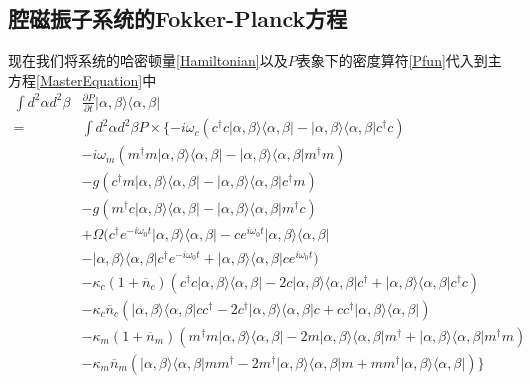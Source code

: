\subsection{腔磁振子系统的Fokker-Planck方程}
现在我们将系统的哈密顿量\eqref{Hamiltonian}以及$P$表象下的密度算符\eqref{Pfun}代入到主方程\eqref{MasterEquation}中
\begin{equation}
\begin{aligned}
\int d^{2}\alpha d^{2}\beta &\frac{\partial P}{\partial t} |\alpha,\beta\rangle \langle \alpha,\beta| \\
= {} &\int d^{2}\alpha d^{2}\beta P \times 
\{ 
-i\omega_{c} \left(c^{\dag}c|\alpha,\beta\rangle \langle \alpha,\beta| - |\alpha,\beta\rangle \langle \alpha,\beta|c^{\dag}c\right) \\
&-i\omega_{m} \left(m^{\dag}m|\alpha,\beta\rangle \langle \alpha,\beta| - |\alpha,\beta\rangle \langle \alpha,\beta|m^{\dag}m\right) \\
&-g \left(c^{\dag}m|\alpha,\beta\rangle \langle \alpha,\beta| - |\alpha,\beta\rangle \langle \alpha,\beta|c^{\dag}m\right) \\
&-g \left(m^{\dag}c|\alpha,\beta\rangle \langle \alpha,\beta| - |\alpha,\beta\rangle \langle \alpha,\beta|m^{\dag}c\right) \\
&+\Omega (c^{\dag}e^{-i\omega_{0}t}|\alpha,\beta\rangle \langle \alpha,\beta|-ce^{i\omega_{0}t}|\alpha,\beta\rangle \langle \alpha,\beta| \\
&-|\alpha,\beta\rangle \langle \alpha,\beta|c^{\dag}e^{-i\omega_{0}t}+|\alpha,\beta\rangle \langle \alpha,\beta|ce^{i\omega_{0}t}) \\
&-\kappa_{c}(1+\overline{n}_{c})(c^{\dag}c|\alpha,\beta\rangle \langle \alpha,\beta|-2c|\alpha,\beta\rangle \langle \alpha,\beta| c^{\dag}+|\alpha,\beta\rangle \langle \alpha,\beta| c^{\dag}c) \\
&-\kappa_{c}\overline{n}_{c}(|\alpha,\beta\rangle \langle \alpha,\beta| cc^{\dag}-2c^{\dag}|\alpha,\beta\rangle \langle \alpha,\beta| c+cc^{\dag}|\alpha,\beta\rangle \langle \alpha,\beta|) \\
&-\kappa_{m}(1+\overline{n}_{m})(m^{\dag}m|\alpha,\beta\rangle \langle \alpha,\beta|-2m|\alpha,\beta\rangle \langle \alpha,\beta| m^{\dag}+|\alpha,\beta\rangle \langle \alpha,\beta| m^{\dag}m) \\
&-\kappa_{m}\overline{n}_{m}(|\alpha,\beta\rangle \langle \alpha,\beta| mm^{\dag}-2m^{\dag}|\alpha,\beta\rangle \langle \alpha,\beta| m+mm^{\dag}|\alpha,\beta\rangle \langle \alpha,\beta|)
\}
\label{master2fp}
\end{aligned}
\end{equation}
